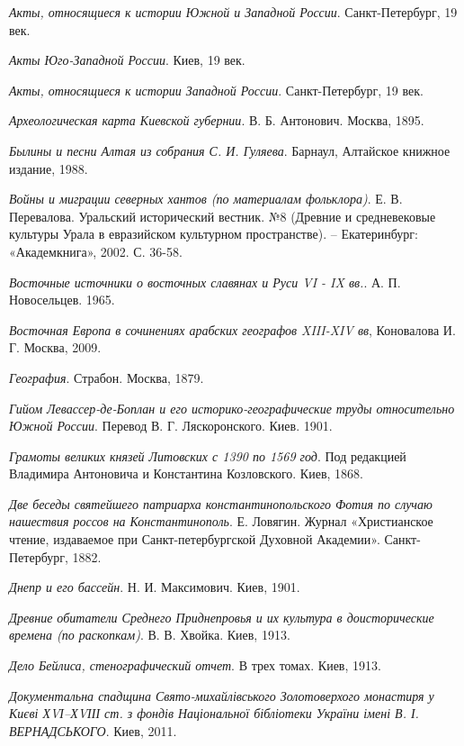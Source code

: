 \emph{Акты, относящиеся к истории Южной и Западной России}. Санкт-Петербург, 19 век. 

\emph{Акты Юго-Западной России}. Киев, 19 век. 

\emph{Акты, относящиеся к истории Западной России}. Санкт-Петербург, 19 век. 

\emph{Археологическая карта Киевской губернии}. В. Б. Антонович. Москва, 1895. 

\emph{Былины и песни Алтая из собрания С. И. Гуляева}. Барнаул, Алтайское книжное издание, 1988.

\emph{Войны и миграции северных хантов (по материалам фольклора)}. Е. В. Перевалова.  Уральский исторический вестник. №8 (Древние и средневековые культуры Урала в евразийском культурном пространстве). – Екатеринбург: «Академкнига», 2002. С. 36-58. 

\emph{Восточные источники о восточных славянах и Руси VI - IX вв.}. А. П. Новосельцев. 1965.

\emph{Восточная Европа в сочинениях арабских географов XIII-XIV вв}, Коновалова И. Г. Москва,  2009.

\emph{География}. Страбон. Москва, 1879.

\emph{Гийом Левассер-де-Боплан и его историко-географические труды относительно Южной России}. Перевод В. Г. Ляскоронского. Киев. 1901. 

\emph{Грамоты великих князей Литовских с 1390 по 1569 год}. Под редакцией Владимира Антоновича и Константина Козловского. Киев, 1868.

\emph{Две беседы святейшего патриарха константинопольского Фотия по случаю нашествия россов на Константинополь}. Е. Ловягин. Журнал «Христианское чтение, издаваемое при Санкт-петербургской Духовной Академии». Санкт-Петербург, 1882.

\emph{Днепр и его бассейн}. Н. И. Максимович. Киев, 1901.

\emph{Древние обитатели Среднего Приднепровья и их культура в доисторические времена (по раскопкам)}. В. В. Хвойка. Киев, 1913.

\emph{Дело Бейлиса, стенографический отчет}. В трех томах. Киев, 1913.

\emph{Документальна спадщина
Свято-михайлівського Золотоверхого
монастиря у Києві ХVІ–ХVІІІ ст.
з фондів Національної бібліотеки
України імені В. І. ВЕРНАДСЬКОГО}. Киев, 2011.

